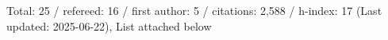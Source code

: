 Total: 25 / refereed: 16 / first author: 5 / citations: 2,588 / h-index: 17 (Last updated: 2025-06-22), List attached below